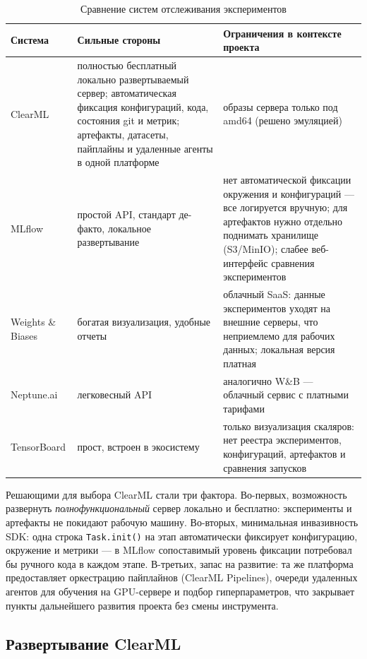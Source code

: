 \begin{table}[H]
\centering
\caption{Сравнение систем отслеживания экспериментов}
\label{tab:tracking-comparison}
\small
\begin{tabularx}{\textwidth}{@{}l X X@{}}
\toprule
\textbf{Система} & \textbf{Сильные стороны} & \textbf{Ограничения в контексте проекта} \\
\midrule
ClearML & полностью бесплатный локально развертываемый сервер; автоматическая фиксация конфигураций, кода, состояния git и метрик; артефакты, датасеты, пайплайны и удаленные агенты в одной платформе & образы сервера только под amd64 (решено эмуляцией) \\
MLflow & простой API, стандарт де-факто, локальное развертывание & нет автоматической фиксации окружения и конфигураций --- все логируется вручную; для артефактов нужно отдельно поднимать хранилище (S3/MinIO); слабее веб-интерфейс сравнения экспериментов \\
Weights \& Biases & богатая визуализация, удобные отчеты & облачный SaaS: данные экспериментов уходят на внешние серверы, что неприемлемо для рабочих данных; локальная версия платная \\
Neptune.ai & легковесный API & аналогично W\&B --- облачный сервис с платными тарифами \\
TensorBoard & прост, встроен в экосистему & только визуализация скаляров: нет реестра экспериментов, конфигураций, артефактов и сравнения запусков \\
\bottomrule
\end{tabularx}
\end{table}

Решающими для выбора ClearML стали три фактора.
Во-первых, возможность развернуть \emph{полнофункциональный} сервер локально и бесплатно: эксперименты и артефакты не покидают рабочую машину.
Во-вторых, минимальная инвазивность SDK: одна строка \texttt{Task.init()} на этап автоматически фиксирует конфигурацию, окружение и метрики --- в MLflow сопоставимый уровень фиксации потребовал бы ручного кода в каждом этапе.
В-третьих, запас на развитие: та же платформа предоставляет оркестрацию пайплайнов (ClearML Pipelines), очереди удаленных агентов для обучения на GPU-сервере и подбор гиперпараметров, что закрывает пункты дальнейшего развития проекта без смены инструмента.

\subsection{Развертывание ClearML}

